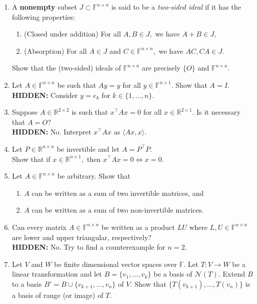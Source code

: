 \documentclass[12pt]{article}
\newcommand{\hint}[1]{\textbf{HIDDEN:} {\color[rgb]{0.95, 0.95, 0.95}#1}}
\begin{document}
\begin{enumerate}[leftmargin=*]
	\item A \textbf{nonempty} subset $J \subset \mathbb{F}^{n \times n}$ is said to be a \emph{two-sided ideal} if it has the following properties:
	\begin{enumerate}
		\item (Closed under addition) For all $A, B \in J,$ we have $A + B \in J,$
		\item (Absorption) For all $A \in J$ and $C \in \mathbb{F}^{n \times n},$ we have $AC, CA \in J.$
	\end{enumerate}
	Show that the (two-sided) ideals of $\mathbb{F}^{n \times n}$ are precisely $\{O\}$ and $\mathbb{F}^{n \times n}.$
	\item Let $A \in \mathbb{F}^{n \times n}$ be such that $Ay = y$ for all $y \in \mathbb{F}^{n \times 1}.$ Show that $A = I.$\\
	\hint{Consider $y = e_k$ for $k \in \{1, \ldots, n\}.$}
	\item Suppose $A \in \mathbb{R}^{2 \times 2}$ is such that $x^\top Ax = 0$ for all $x \in \mathbb{R}^{2 \times 1}.$ Is it necessary that $A = O?$\\
	\hint{No. Interpret $x^\top Ax$ as $\langle Ax, x\rangle.$}
	\item Let $P \in \mathbb{R}^{n \times n}$ be invertible and let $A = P^{\top}P.$ \\
	Show that if $x \in \mathbb{R}^{n \times 1},$ then $x^\top Ax = 0 \iff x = 0.$
	\item Let $A \in \mathbb{F}^{n \times n}$ be arbitrary. Show that
	\begin{enumerate}
		\item $A$ can be written as a sum of two invertible matrices, and
		\item $A$ can be written as a sum of two non-invertible matrices.
	\end{enumerate}
	\item Can every matrix $A \in \mathbb{F}^{n \times n}$ be written as a product $LU$ where $L, U \in \mathbb{F}^{n \times n}$ are lower and upper triangular, respectively?\\
	\hint{No. Try to find a counterexample for $n = 2.$}
	\item Let $V$ and $W$ be finite dimensional vector spaces over $\mathbb{F}.$ Let $T : V \to W$ be a linear transformation and let $B = \{v_1, \ldots, v_k\}$ be a basis of $\mathcal{N}(T).$ Extend $B$ to a basis $B' = B \cup \{v_{k + 1}, \ldots, v_n\}$ of $V.$ Show that $\{T(v_{k+1}), \ldots, T(v_n)\}$ is a basis of range (or image) of $T.$\\

\end{enumerate}
\end{document}
